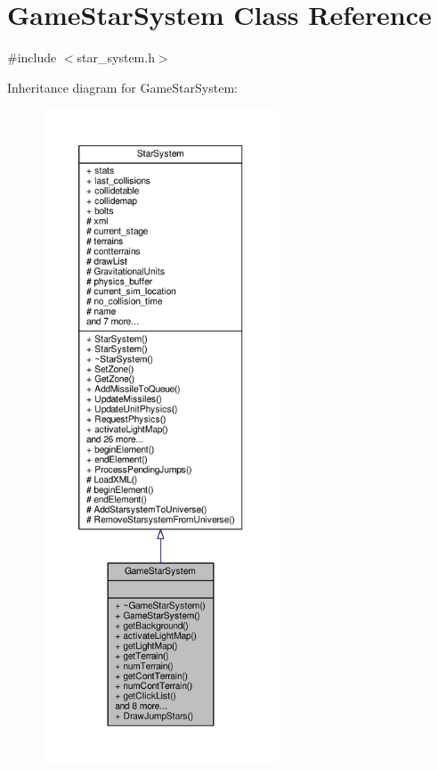 \hypertarget{classGameStarSystem}{}\section{Game\+Star\+System Class Reference}
\label{classGameStarSystem}


{\ttfamily \#include $<$star\+\_\+system.\+h$>$}



Inheritance diagram for Game\+Star\+System\+:
\nopagebreak
\begin{figure}[H]
\begin{center}
\leavevmode
\includegraphics[height=550pt]{d6/d6b/classGameStarSystem__inherit__graph}
\end{center}
\end{figure}


